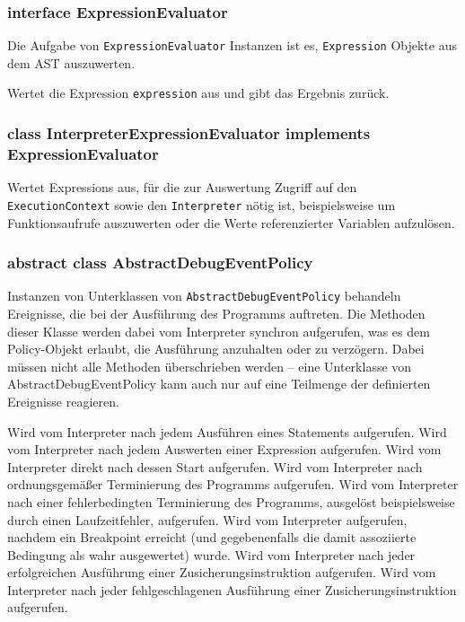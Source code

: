 \subsubsection{interface ExpressionEvaluator}
Die Aufgabe von \texttt{ExpressionEvaluator} Instanzen ist es, \texttt{Expression} Objekte aus dem AST auszuwerten.
\begin{description}
    Wertet die Expression \texttt{expression} aus und gibt das Ergebnis zurück.
\end{description}

\subsubsection{class InterpreterExpressionEvaluator implements ExpressionEvaluator}
Wertet Expressions aus, für die zur Auswertung Zugriff auf den \texttt{ExecutionContext} sowie den \texttt{Interpreter} nötig ist, beispielsweise um Funktionsaufrufe auszuwerten oder die Werte referenzierter Variablen aufzulösen.

\subsubsection{abstract class AbstractDebugEventPolicy}
Instanzen von Unterklassen von \texttt{AbstractDebugEventPolicy} behandeln Ereignisse, die bei der Ausführung des Programms auftreten. Die Methoden dieser Klasse werden dabei vom Interpreter synchron aufgerufen, was es dem Policy-Objekt erlaubt, die Ausführung anzuhalten oder zu verzögern. Dabei müssen nicht alle Methoden überschrieben werden -- eine Unterklasse von AbstractDebugEventPolicy kann auch nur auf eine Teilmenge der definierten Ereignisse reagieren.

\begin{description}
    Wird vom Interpreter nach jedem Ausführen eines Statements aufgerufen.
    Wird vom Interpreter nach jedem Auswerten einer Expression aufgerufen.
    Wird vom Interpreter direkt nach dessen Start aufgerufen.
    Wird vom Interpreter nach ordnungsgemäßer Terminierung des Programms aufgerufen.
    Wird vom Interpreter nach einer fehlerbedingten Terminierung des Programms, ausgelöst beispielsweise durch einen Laufzeitfehler, aufgerufen.
    Wird vom Interpreter aufgerufen, nachdem ein Breakpoint erreicht (und gegebenenfalls die damit assoziierte Bedingung als wahr ausgewertet) wurde.
    Wird vom Interpreter nach jeder erfolgreichen Ausführung einer Zusicherungsinstruktion aufgerufen.
    Wird vom Interpreter nach jeder fehlgeschlagenen Ausführung einer Zusicherungsinstruktion aufgerufen.
\end{description}
